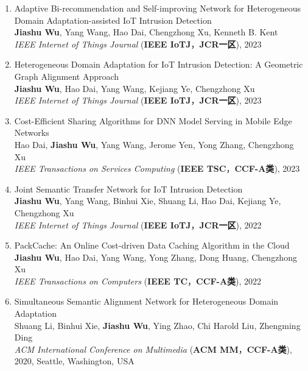 \documentclass[UTF8,letterpaper,11pt]{article}
\begin{document}
\begin{enumerate}
  \setlength\itemsep{1pt}
  \item Adaptive Bi-recommendation and Self-improving Network for Heterogeneous Domain Adaptation-assisted IoT Intrusion Detection\\
  \textbf{Jiashu Wu}, Yang Wang\textsuperscript{\Letter}, Hao Dai, Chengzhong Xu, Kenneth B. Kent\\
  \textit{IEEE Internet of Things Journal} (\textbf{IEEE IoTJ}，\textbf{JCR一区}), 2023

  \item Heterogeneous Domain Adaptation for IoT Intrusion Detection: A Geometric Graph Alignment Approach\\
  \textbf{Jiashu Wu}, Hao Dai, Yang Wang\textsuperscript{\Letter}, Kejiang Ye, Chengzhong Xu\\
  \textit{IEEE Internet of Things Journal} (\textbf{IEEE IoTJ}，\textbf{JCR一区}), 2023

  \item Cost-Efficient Sharing Algorithms for DNN Model Serving in Mobile Edge Networks\\
  Hao Dai, \textbf{Jiashu Wu}, Yang Wang\textsuperscript{\Letter}, Jerome Yen, Yong Zhang, Chengzhong Xu\\
  \textit{IEEE Transactions on Services Computing} (\textbf{IEEE TSC}，\textbf{CCF-A类}), 2023

  \item Joint Semantic Transfer Network for IoT Intrusion Detection\\
  \textbf{Jiashu Wu}, Yang Wang\textsuperscript{\Letter}, Binhui Xie, Shuang Li, Hao Dai, Kejiang Ye, Chengzhong Xu\\
  \textit{IEEE Internet of Things Journal} (\textbf{IEEE IoTJ}，\textbf{JCR一区}), 2022

  \item PackCache: An Online Cost-driven Data Caching Algorithm in the Cloud\\
  \textbf{Jiashu Wu}, Hao Dai, Yang Wang\textsuperscript{\Letter}, Yong Zhang, Dong Huang, Chengzhong Xu\\
  \textit{IEEE Transactions on Computers} (\textbf{IEEE TC}，\textbf{CCF-A类}), 2022

  \item Simultaneous Semantic Alignment Network for Heterogeneous Domain Adaptation\\
  Shuang Li, Binhui Xie, \textbf{Jiashu Wu}, Ying Zhao, Chi Harold Liu\textsuperscript{\Letter}, Zhengming Ding\\
  \textit{ACM International Conference on Multimedia} (\textbf{ACM MM}，\textbf{CCF-A类}), 2020, Seattle, Washington, USA


\end{enumerate}
\end{document}
